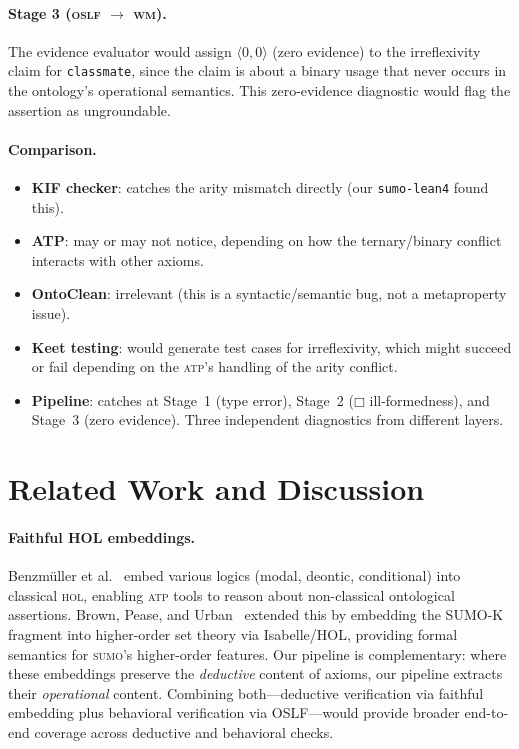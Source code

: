 \documentclass[11pt]{article}
\newcommand{\BoxOp}{\mathbin{\Box}}
\newcommand{\SUMO}{\textsc{sumo}}
\newcommand{\OSLF}{\textsc{oslf}}
\newcommand{\WM}{\textsc{wm}}
\newcommand{\HOL}{\textsc{hol}}
\newcommand{\ATP}{\textsc{atp}}
\newcommand{\ev}[2]{\langle #1, #2 \rangle}
\theoremstyle{definition}
\theoremstyle{plain}
\begin{document}
\paragraph{Stage 3 (\OSLF{} $\to$ \WM{}).}
The evidence evaluator would assign $\ev{0}{0}$ (zero evidence) to
the irreflexivity claim for \texttt{classmate}, since the claim is
about a binary usage that never occurs in the ontology's operational
semantics.
This zero-evidence diagnostic would flag the assertion as
ungroundable.

\paragraph{Comparison.}
\begin{itemize}[nosep]
  \item \textbf{KIF checker}: catches the arity mismatch directly
    (our \texttt{sumo-lean4} found this).
  \item \textbf{ATP}: may or may not notice, depending on how the
    ternary/binary conflict interacts with other axioms.
  \item \textbf{OntoClean}: irrelevant (this is a syntactic/semantic
    bug, not a metaproperty issue).
  \item \textbf{Keet testing}: would generate test cases for
    irreflexivity, which might succeed or fail depending on the
    \ATP{}'s handling of the arity conflict.
  \item \textbf{Pipeline}: catches at Stage~1 (type error),
    Stage~2 ($\BoxOp$ ill-formedness), and Stage~3 (zero evidence).
    Three independent diagnostics from different layers.
\end{itemize}

\section{Related Work and Discussion}
\label{sec:related}

\paragraph{Faithful HOL embeddings.}
Benzm\"uller et al.~\cite{benzmuller-faithful-embeddings} embed
various logics (modal, deontic, conditional) into classical \HOL{},
enabling \ATP{} tools to reason about non-classical ontological
assertions.  Brown, Pease, and Urban~\cite{brown2022sumo-set-theory}
extended this by embedding the SUMO-K fragment into higher-order set
theory via Isabelle/HOL, providing formal semantics for \SUMO{}'s
higher-order features.
Our pipeline is complementary: where these embeddings
preserve the \emph{deductive} content of axioms, our pipeline extracts
their \emph{operational} content.
Combining both---deductive verification via faithful embedding plus
behavioral verification via OSLF---would provide broader end-to-end
coverage across deductive and behavioral checks.
\end{document}
